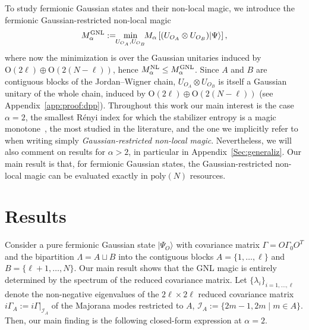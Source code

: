 \documentclass[prx,twocolumn,superscriptaddress,aps,10pt, frontmatterverbose, reprint,footinbib,longbibliography=true]{revtex4-2}
\newcommand{\RENYI}{\alpha}
\begin{document}
To study fermionic Gaussian states and their non-local magic, we introduce the fermionic Gaussian-restricted non-local magic
\begin{equation}
    M_\RENYI^\textup{GNL}:= \!\!\min_{U_{O_A} , U_{O_B}} \!\!M_\RENYI\left[(U_{O_A}\otimes U_{O_B})|\Psi\rangle\right],\label{eq:defGNLmagic}
\end{equation}
where now the minimization is over the Gaussian unitaries induced by $\mathrm{O}(2\ell)\oplus \mathrm{O}(2(N-\ell))$, hence $ M_\RENYI^\textup{NL} \leq  M_\RENYI^\textup{GNL}$. Since $A$ and $B$ are contiguous blocks of the Jordan--Wigner chain, $U_{O_A}\otimes U_{O_B}$ is itself a Gaussian unitary of the whole chain, induced by $\mathrm{O}(2\ell)\oplus\mathrm{O}(2(N-\ell))$ (see Appendix~\ref{app:proof:dpp}).
Throughout this work our main interest is the case $\RENYI=2$, the smallest R\'enyi index for which the stabilizer entropy is a magic monotone~\cite{piro,leone2024stabilizer}, the most studied in the literature, and the one we implicitly refer to when writing simply \emph{Gaussian-restricted non-local magic}. Nevertheless, we will also comment on results for $\RENYI>2$, in particular in Appendix~\ref{Sec:generaliz}.
Our main result is that, for fermionic Gaussian states, the Gaussian-restricted non-local magic can be evaluated exactly in $\mathrm{poly}(N)$ resources.

\section{Results}
Consider a pure fermionic Gaussian state $|\Psi_O\rangle$ with covariance matrix $\Gamma=O \Gamma_0 O^T$ and the bipartition $\Lambda = A\sqcup B$ into the contiguous blocks $A=\{1,\dots,\ell\}$ and $B=\{\ell+1,\dots,N\}$. 
Our main result shows that the GNL magic is entirely determined by the spectrum of the reduced covariance matrix. Let $\{\lambda_i\}_{i=1,\dots,\ell}$ denote the non-negative eigenvalues of the $2\ell\times 2\ell$ reduced covariance matrix $i\Gamma_A := i\Gamma|_{\mathcal{I}_A}$ of the Majorana modes restricted to $A$, $\mathcal{I}_A:=\{2m-1,2m\;|\; m\in A\}$. Then, our main finding is the following closed-form expression at $\RENYI=2$.
\end{document}
